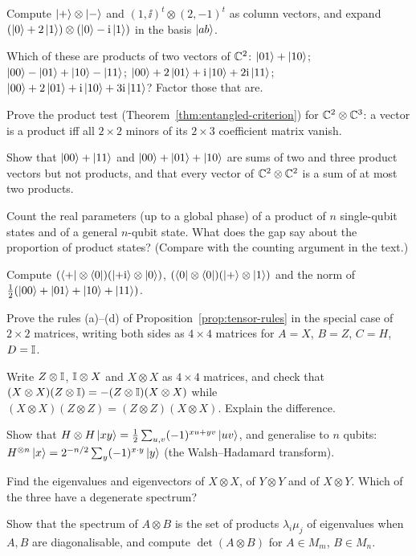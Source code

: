 \begin{exerciseset}
   Compute $\left|+\right\rangle\otimes\left|-\right\rangle$ and $(1,\ii)^t\otimes(2,-1)^t$ as column vectors, and expand $(\left|0\right\rangle+2\left|1\right\rangle)\otimes(\left|0\right\rangle-\mathrm{i}\left|1\right\rangle)$ in the basis $\left|ab\right\rangle$.

   Which of these are products of two vectors of $\mathbb{C}^2$: $\left|01\right\rangle+\left|10\right\rangle$; $\left|00\right\rangle-\left|01\right\rangle+\left|10\right\rangle-\left|11\right\rangle$; $\left|00\right\rangle+2\left|01\right\rangle+\mathrm{i}\left|10\right\rangle+2\mathrm{i}\left|11\right\rangle$; $\left|00\right\rangle+2\left|01\right\rangle+\mathrm{i}\left|10\right\rangle+3\mathrm{i}\left|11\right\rangle$? Factor those that are.

   Prove the product test (Theorem~\ref{thm:entangled-criterion}) for $\mathbb{C}^2\otimes\mathbb{C}^3$: a vector is a product iff all $2\times2$ minors of its $2\times3$ coefficient matrix vanish.

   Show that $\left|00\right\rangle+\left|11\right\rangle$ and $\left|00\right\rangle+\left|01\right\rangle+\left|10\right\rangle$ are sums of two and three product vectors but not products, and that every vector of $\mathbb{C}^2\otimes\mathbb{C}^2$ is a sum of at most two products.

   Count the real parameters (up to a global phase) of a product of $n$ single-qubit states and of a general $n$-qubit state. What does the gap say about the proportion of product states? (Compare with the counting argument in the text.)

   Compute $(\left\langle+\right|\otimes\left\langle0\right|)(\left|+\mathrm{i}\right\rangle\otimes\left|0\right\rangle)$, $(\left\langle0\right|\otimes\left\langle0\right|)(\left|+\right\rangle\otimes\left|1\right\rangle)$ and the norm of $\tfrac12(\left|00\right\rangle+\left|01\right\rangle+\left|10\right\rangle+\left|11\right\rangle)$.

   Prove the rules (a)--(d) of Proposition~\ref{prop:tensor-rules} in the special case of $2\times2$ matrices, writing both sides as $4\times4$ matrices for $A=X$, $B=Z$, $C=H$, $D=\mathbb{I}$.

   Write $Z\otimes\mathbb{I}$, $\mathbb{I}\otimes X$ and $X\otimes X$ as $4\times4$ matrices, and check that $(X\otimes X)(Z\otimes\mathbb{I})=-(Z\otimes\mathbb{I})(X\otimes X)$ while $(X\otimes X)(Z\otimes Z)=(Z\otimes Z)(X\otimes X)$. Explain the difference.

   Show that $H\otimes H\left|xy\right\rangle=\frac12\sum_{u,v}(-1)^{xu+yv}\left|uv\right\rangle$, and generalise to $n$ qubits: $H^{\otimes n}\left|x\right\rangle=2^{-n/2}\sum_y(-1)^{x\cdot y}\left|y\right\rangle$ (the Walsh--Hadamard transform).

   Find the eigenvalues and eigenvectors of $X\otimes X$, of $Y\otimes Y$ and of $X\otimes Y$. Which of the three have a degenerate spectrum?

   Show that the spectrum of $A\otimes B$ is the set of products $\lambda_i\mu_j$ of eigenvalues when $A,B$ are diagonalisable, and compute $\det(A\otimes B)$ for $A\in M_m$, $B\in M_n$.


\end{exerciseset}
